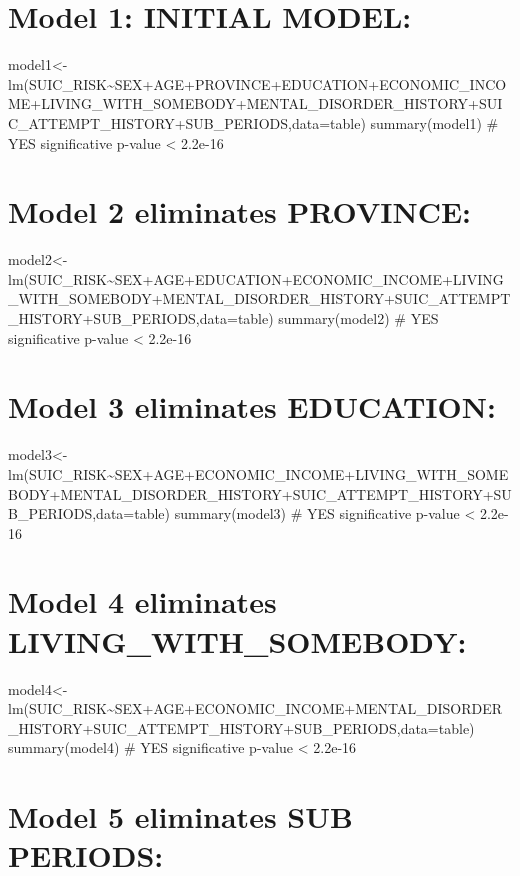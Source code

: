 \documentclass[
]{book}
\begin{document}
\hypertarget{model-1-initial-model-3}{%
\chapter{Model 1: INITIAL MODEL:}\label{model-1-initial-model-3}}

model1\textless-lm(SUIC\_RISK\textasciitilde SEX+AGE+PROVINCE+EDUCATION+ECONOMIC\_INCOME+LIVING\_WITH\_SOMEBODY+MENTAL\_DISORDER\_HISTORY+SUIC\_ATTEMPT\_HISTORY+SUB\_PERIODS,data=table)
summary(model1)
\# YES significative p-value \textless{} 2.2e-16

\hypertarget{model-2-eliminates-province-2}{%
\chapter{Model 2 eliminates PROVINCE:}\label{model-2-eliminates-province-2}}

model2\textless-lm(SUIC\_RISK\textasciitilde SEX+AGE+EDUCATION+ECONOMIC\_INCOME+LIVING\_WITH\_SOMEBODY+MENTAL\_DISORDER\_HISTORY+SUIC\_ATTEMPT\_HISTORY+SUB\_PERIODS,data=table)
summary(model2)
\# YES significative p-value \textless{} 2.2e-16

\hypertarget{model-3-eliminates-education-2}{%
\chapter{Model 3 eliminates EDUCATION:}\label{model-3-eliminates-education-2}}

model3\textless-lm(SUIC\_RISK\textasciitilde SEX+AGE+ECONOMIC\_INCOME+LIVING\_WITH\_SOMEBODY+MENTAL\_DISORDER\_HISTORY+SUIC\_ATTEMPT\_HISTORY+SUB\_PERIODS,data=table)
summary(model3)
\# YES significative p-value \textless{} 2.2e-16

\hypertarget{model-4-eliminates-living_with_somebody-2}{%
\chapter{Model 4 eliminates LIVING\_WITH\_SOMEBODY:}\label{model-4-eliminates-living_with_somebody-2}}

model4\textless-lm(SUIC\_RISK\textasciitilde SEX+AGE+ECONOMIC\_INCOME+MENTAL\_DISORDER\_HISTORY+SUIC\_ATTEMPT\_HISTORY+SUB\_PERIODS,data=table)
summary(model4)
\# YES significative p-value \textless{} 2.2e-16

\hypertarget{model-5-eliminates-sub-periods-1}{%
\chapter{Model 5 eliminates SUB PERIODS:}\label{model-5-eliminates-sub-periods-1}}
\end{document}
